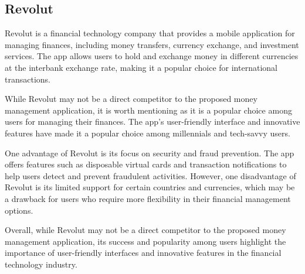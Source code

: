 \subsection{Revolut}
\hspace{\parindent}Revolut is a financial technology company that provides a mobile application for managing finances, including money transfers, currency exchange, and investment services. The app allows users to hold and exchange money in different currencies at the interbank exchange rate, making it a popular choice for international transactions.

\hspace{\parindent}While Revolut may not be a direct competitor to the proposed money management application, it is worth mentioning as it is a popular choice among users for managing their finances. The app's user-friendly interface and innovative features have made it a popular choice among millennials and tech-savvy users.

\hspace{\parindent}One advantage of Revolut is its focus on security and fraud prevention. The app offers features such as disposable virtual cards and transaction notifications to help users detect and prevent fraudulent activities. However, one disadvantage of Revolut is its limited support for certain countries and currencies, which may be a drawback for users who require more flexibility in their financial management options.

\hspace{\parindent}Overall, while Revolut may not be a direct competitor to the proposed money management application, its success and popularity among users highlight the importance of user-friendly interfaces and innovative features in the financial technology industry.

